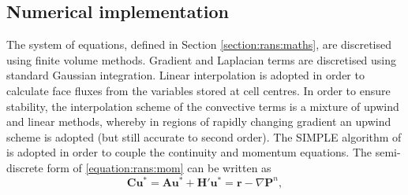 \documentclass[12pt,oneside,a4paper]{article}
\newcommand{\vect}[1]{\boldsymbol{#1}}
\begin{document}
\subsection{Numerical implementation}
The system of equations, defined in Section \ref{section:rans:maths}, are discretised using finite volume methods. Gradient and Laplacian terms are discretised using standard Gaussian integration. Linear interpolation is adopted in order to calculate face fluxes from the variables stored at cell centres. In order to ensure stability, the interpolation scheme of the convective terms is a mixture of upwind and linear methods, whereby in regions of rapidly changing gradient an upwind scheme is adopted (but still accurate to second order). The SIMPLE algorithm of \cite{caretto1973} is adopted in order to couple the continuity and momentum equations. The semi-discrete form of \eqref{equation:rans:mom} can be written as
\begin{equation}
\label{equation:piso1}
\vect{C} \vect{u}^* =  \vect{A}\vect{u}^* + \vect{H'}\vect{u}^* =\vect{r} - \nabla \vect{P}^n,
\end{equation}
\end{document}
